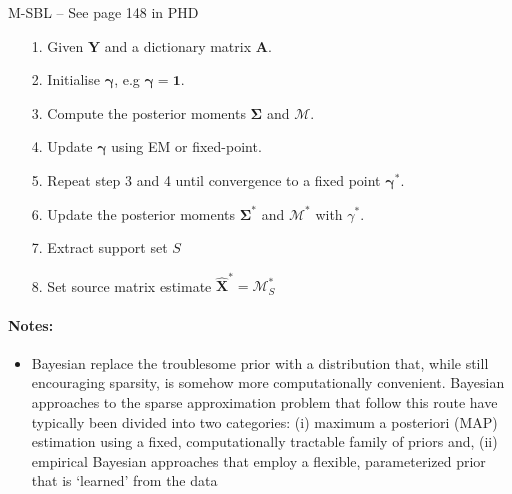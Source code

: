 \begin{algorithm}[H]
\caption{M-SBL -- See page 148 in PHD}
\begin{itemize}
\item[1.] Given $\mathbf{Y}$ and a dictionary matrix $\mathbf{A}$.
\item[2.] Initialise $\boldsymbol{\gamma}$, e.g $\boldsymbol{\gamma} = \mathbf{1}$.
\item[3.] Compute the posterior moments $\boldsymbol{\Sigma}$ and $\mathcal{M}$.
\item[4.] Update $\boldsymbol{\gamma}$ using EM or fixed-point.
\item[5.] Repeat step 3 and 4 until convergence to a fixed point $\boldsymbol{\gamma}^\ast$.
\item[6.] Update the posterior moments $\boldsymbol{\Sigma}^\ast$ and $\mathcal{M}^\ast$ with $\gamma^\ast$.
\item[7.] Extract support set $S$
\item[8.] Set source matrix estimate $\hat{\mathbf{X}}^\ast = \mathcal{M}^\ast_S$
\end{itemize}
\end{algorithm}

\paragraph{Notes:}
\begin{itemize}
\item Bayesian replace the troublesome prior with a distribution that, while still encouraging sparsity, is somehow more computationally convenient. Bayesian approaches to the sparse approximation problem that follow this route have typically been divided into two categories: (i) maximum a posteriori (MAP) estimation using a fixed, computationally tractable family of priors and, (ii) empirical Bayesian approaches that employ a flexible, parameterized prior that is ‘learned’ from the data
\end{itemize}